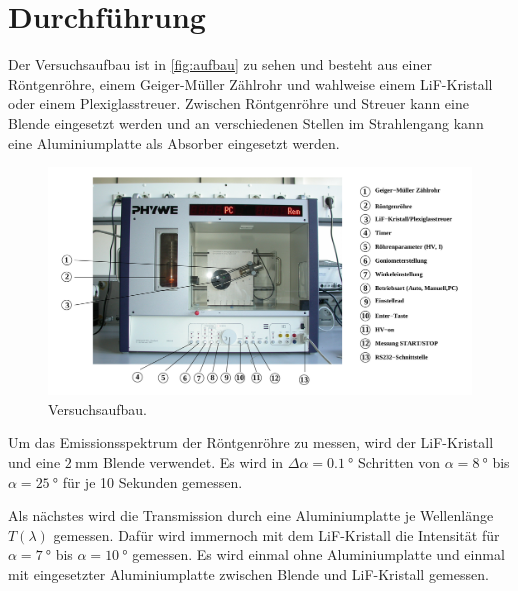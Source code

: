 \newpage
\section{Durchführung}
\label{sec:Durchführung}


Der Versuchsaufbau ist in \autoref{fig:aufbau} zu sehen und besteht aus einer Röntgenröhre, einem Geiger-Müller Zählrohr und wahlweise einem LiF-Kristall oder einem Plexiglasstreuer.
Zwischen Röntgenröhre und Streuer kann eine Blende eingesetzt werden und an verschiedenen Stellen im Strahlengang kann eine Aluminiumplatte als Absorber eingesetzt werden.

\begin{figure}
    \centering
    \includegraphics[width=\textwidth]{images/bild_3.png}
    \caption{Versuchsaufbau.\cite{V603}}
    \label{fig:aufbau}
\end{figure}

Um das Emissionsspektrum der Röntgenröhre zu messen, wird der LiF-Kristall und eine $\SI{2}{\milli\metre}$ Blende verwendet.
Es wird in $\Delta \alpha = \SI{0.1}{\degree}$ Schritten von $\alpha=\SI{8}{\degree}$ bis $\alpha = \SI{25}{\degree}$ für je 10 Sekunden gemessen.

\FloatBarrier

Als nächstes wird die Transmission durch eine Aluminiumplatte je Wellenlänge $T(\lambda)$ gemessen.
Dafür wird immernoch mit dem LiF-Kristall die Intensität für $\alpha = \SI{7}{\degree}$ bis $\alpha = \SI{10}{\degree}$ gemessen.
Es wird einmal ohne Aluminiumplatte und einmal mit eingesetzter Aluminiumplatte zwischen Blende und LiF-Kristall gemessen.

